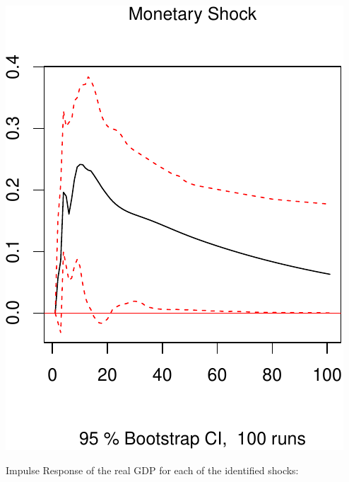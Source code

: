 \documentclass[11pt,preprint, authoryear]{elsarticle}
\numberwithin{equation}{section}
\numberwithin{figure}{section}
\numberwithin{table}{section}
\begin{document}
\includegraphics{TS_proj_files/figure-latex/unnamed-chunk-41-3.pdf}

\newpage

Impulse Response of the real GDP for each of the identified shocks:
\end{document}
